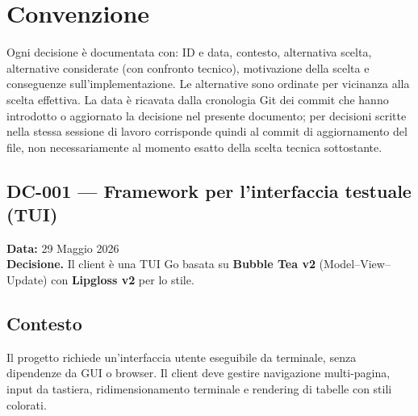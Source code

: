 \documentclass[a4paper,12pt]{article}
\begin{document}

\section*{Convenzione}
Ogni decisione \`{e} documentata con: ID e data, contesto, alternativa scelta, alternative considerate (con confronto tecnico), motivazione della scelta e conseguenze sull'implementazione. Le alternative sono ordinate per vicinanza alla scelta effettiva. La data \`{e} ricavata dalla cronologia Git dei commit che hanno introdotto o aggiornato la decisione nel presente documento; per decisioni scritte nella stessa sessione di lavoro corrisponde quindi al commit di aggiornamento del file, non necessariamente al momento esatto della scelta tecnica sottostante.

\newpage

\begin{decisionbox}
\section*{DC-001 --- Framework per l'interfaccia testuale (TUI)}
\textbf{Data:} 29 Maggio 2026\\
\textbf{Decisione.} Il client \`{e} una TUI Go basata su \textbf{Bubble Tea v2} (Model--View--Update) con \textbf{Lipgloss v2} per lo stile.
\end{decisionbox}

\subsection*{Contesto}
Il progetto richiede un'interfaccia utente eseguibile da terminale, senza dipendenze da GUI o browser. Il client deve gestire navigazione multi-pagina, input da tastiera, ridimensionamento terminale e rendering di tabelle con stili colorati.

\end{document}
